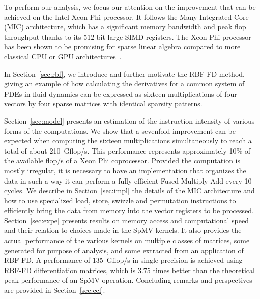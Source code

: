 \documentclass{sig-alternate}
\def\ee#1{{#1}}
\def\NOTE#1{{}}
\def\ge#1{{#1}}
\begin{document}
To perform our analysis, we focus our attention on the improvement
that can be achieved on the Intel Xeon Phi processor. It follows the
Many Integrated Core (MIC) architecture, which has a significant
memory bandwidth and peak flop throughput thanks to its 512-bit large
SIMD registers. The Xeon Phi processor has been shown to be promising
for sparse linear algebra compared to more classical CPU or GPU
architectures~\cite{Saule13-ARXIV, Liu:2013:ESM:2464996.2465013, cramer2012openmp}.

In Section~\ref{sec:rbf}, we introduce and further motivate the RBF-FD method, giving 
an example of how calculating the derivatives for a common system of PDEs in fluid dynamics 
can be expressed as sixteen multiplications of four vectors by four sparse matrices with 
identical sparsity patterns.

Section~\ref{sec:model} presents an
estimation of the instruction intensity of various forms of the
computations. We show that a \ge{sevenfold} \NOTE{sixfold was inconsistent with eighfold in the abstract.} improvement can be
expected when computing the sixteen multiplications simultaneously to
reach a total of about 210~Gflop/s. This performance represents
approximately 10\% of the available flop/s of a Xeon Phi
coprocessor. \ee{Provided the computation is mostly irregular, it is necessary to have an implementation that organizes the data in such a way it can perform a fully efficient Fused Multiply-Add every 10 cycles.} \NOTE{Rewrote, is it more clear?}
\ge{We describe in Section~\ref{sec:impl} the details of the MIC
architecture and how to use specialized load, store, swizzle and
permutation instructions to efficiently bring the data from memory into the vector
registers to be processed. Section~\ref{sec:expe} presents results on 
memory access and computational speed and their relation to choices made in the 
SpMV kernels.}
It also provides the actual performance of the various kernels on multiple classes of matrices, 
some generated for purpose of analysis, and some extracted from an application of RBF-FD. 
A performance of 135~Gflop/s in single precision is achieved using RBF-FD differentiation matrices, which is 3.75 times better than the theoretical peak performance of an SpMV operation. Concluding remarks and perspectives are provided in Section~\ref{sec:ccl}.%
\end{document}
